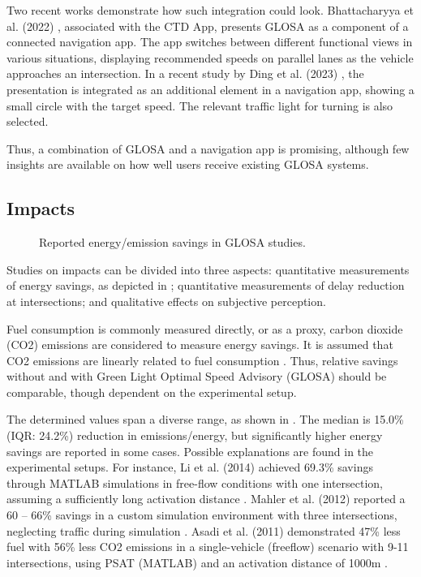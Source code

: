 Two recent works demonstrate how such integration could look. Bhattacharyya et al. (2022) \cite{bhattacharyya_assessing_2022}, associated with the CTD App, presents GLOSA as a component of a connected navigation app. The app switches between different functional views in various situations, displaying recommended speeds on parallel lanes as the vehicle approaches an intersection. In a recent study by Ding et al. (2023) \cite{ding_speedadv_2023}, the presentation is integrated as an additional element in a navigation app, showing a small circle with the target speed. The relevant traffic light for turning is also selected.

Thus, a combination of GLOSA and a navigation app is promising, although few insights are available on how well users receive existing GLOSA systems.

\subsection{Impacts}

\begin{figure}
\centering
\resizebox{\linewidth}{!}{%

}
\caption{Reported energy/emission savings in GLOSA studies.}
\label{fig:related-work-energy-savings}
\end{figure}
Studies on impacts can be divided into three aspects: quantitative measurements of energy savings, as depicted in ; quantitative measurements of delay reduction at intersections; and qualitative effects on subjective perception.

Fuel consumption is commonly measured directly, or as a proxy, carbon dioxide (CO2) emissions are considered to measure energy savings. It is assumed that CO2 emissions are linearly related to fuel consumption \cite{seredynski_comparison_2013, seredynski_multi-segment_2013}. Thus, relative savings without and with Green Light Optimal Speed Advisory (GLOSA) should be comparable, though dependent on the experimental setup.

The determined values span a diverse range, as shown in . The median is 15.0\% (IQR: 24.2\%) reduction in emissions/energy, but significantly higher energy savings are reported in some cases. Possible explanations are found in the experimental setups. For instance, Li et al. (2014) achieved 69.3\% savings through MATLAB simulations in free-flow conditions with one intersection, assuming a sufficiently long activation distance \cite{li_multi-vehicles_2014}. Mahler et al. (2012) reported a 60 -- 66\% savings in a custom simulation environment with three intersections, neglecting traffic during simulation \cite{mahler_reducing_2012}. Asadi et al. (2011) demonstrated 47\% less fuel with 56\% less CO2 emissions in a single-vehicle (freeflow) scenario with 9-11 intersections, using PSAT (MATLAB) and an activation distance of 1000m \cite{asadi_predictive_2011}.

